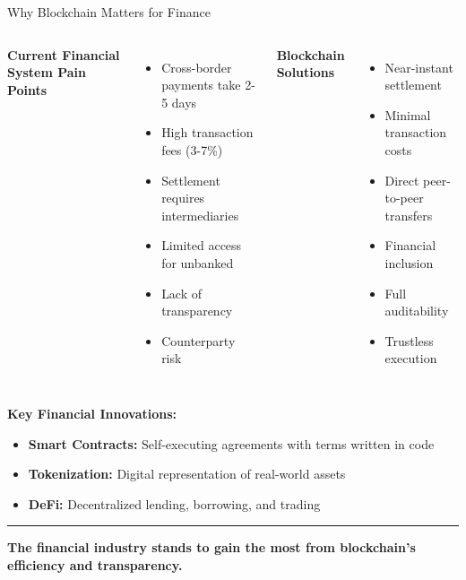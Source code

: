 \documentclass[8pt,aspectratio=169]{beamer}
\newcommand{\bottomnote}[1]{%
\vfill
\vspace{-2mm}
\textcolor{mllavender2}{\rule{\textwidth}{0.4pt}}
\vspace{1mm}
\footnotesize
\textbf{#1}
}
\begin{document}
\begin{frame}[t]{Why Blockchain Matters for Finance}
\begin{columns}[T]
\textbf{Current Financial System Pain Points}
\begin{itemize}
\item[\textcolor{mlred}{$\times$}] Cross-border payments take 2-5 days
\item[\textcolor{mlred}{$\times$}] High transaction fees (3-7\%)
\item[\textcolor{mlred}{$\times$}] Settlement requires intermediaries
\item[\textcolor{mlred}{$\times$}] Limited access for unbanked
\item[\textcolor{mlred}{$\times$}] Lack of transparency
\item[\textcolor{mlred}{$\times$}] Counterparty risk
\end{itemize}

\textbf{Blockchain Solutions}
\begin{itemize}
\item[\textcolor{mlgreen}{$\checkmark$}] Near-instant settlement
\item[\textcolor{mlgreen}{$\checkmark$}] Minimal transaction costs
\item[\textcolor{mlgreen}{$\checkmark$}] Direct peer-to-peer transfers
\item[\textcolor{mlgreen}{$\checkmark$}] Financial inclusion
\item[\textcolor{mlgreen}{$\checkmark$}] Full auditability
\item[\textcolor{mlgreen}{$\checkmark$}] Trustless execution
\end{itemize}
\end{columns}

\vspace{1em}
\textbf{Key Financial Innovations:}
\begin{itemize}
\item \textbf{Smart Contracts:} Self-executing agreements with terms written in code
\item \textbf{Tokenization:} Digital representation of real-world assets
\item \textbf{DeFi:} Decentralized lending, borrowing, and trading
\end{itemize}

\bottomnote{The financial industry stands to gain the most from blockchain's efficiency and transparency.}
\end{frame}
\end{document}
